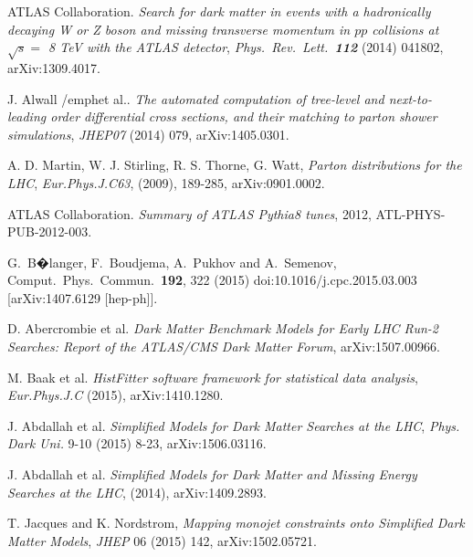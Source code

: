 ATLAS Collaboration. \emph{Search for dark matter in events with a hadronically decaying W or Z boson and missing transverse momentum in $pp$ collisions at $\sqrt{s} =$ 8 TeV with the ATLAS detector}, \emph{Phys.\ Rev.\ Lett.\  {\bf 112}} (2014) 041802, arXiv:1309.4017.

J. Alwall /emph{et al.}. \emph{The automated computation of tree-level and next-to-leading order differential cross sections, and their matching to parton shower simulations}, \emph{JHEP07} (2014) 079, arXiv:1405.0301.

A. D. Martin, W. J. Stirling, R. S. Thorne, G. Watt, \emph{Parton distributions for the LHC}, \emph{Eur.Phys.J.C63}, (2009), 189-285, arXiv:0901.0002.

ATLAS Collaboration. \emph{Summary of ATLAS Pythia8 tunes}, 2012, ATL-PHYS-PUB-2012-003.

  G.~B�langer, F.~Boudjema, A.~Pukhov and A.~Semenov,
  Comput.\ Phys.\ Commun.\  {\bf 192}, 322 (2015)
  doi:10.1016/j.cpc.2015.03.003
  [arXiv:1407.6129 [hep-ph]].

D. Abercrombie et al. \emph{Dark Matter Benchmark Models for Early LHC Run-2 Searches: Report of the ATLAS/CMS Dark Matter Forum}, arXiv:1507.00966.

M. Baak et al. \emph{HistFitter software framework for statistical data analysis}, \emph{Eur.Phys.J.C} (2015), arXiv:1410.1280.

J. Abdallah et al. \emph{Simplified Models for Dark Matter Searches at the LHC}, \emph{Phys. Dark Uni.} 9-10 (2015) 8-23, arXiv:1506.03116.

J. Abdallah et al. \emph{Simplified Models for Dark Matter and Missing Energy Searches at the LHC}, (2014), arXiv:1409.2893.

T. Jacques and K. Nordstrom, \emph{Mapping monojet constraints onto Simplified Dark Matter Models}, \emph{JHEP} 06 (2015) 142, arXiv:1502.05721.
